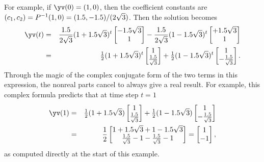 \begin{example}
\begin{solution}
For example, if \(\yv(0)=(1,0)\), then the coefficient constants are \((c_1,c_2)=P^{-1}(1,0)=(1.5,-1.5)/(2\sqrt3)\).
Then the solution becomes
\begin{eqnarray*}
\yv(t)&=&\frac \i{2\sqrt3}(1+\i\sqrt3)^t\begin{bmatrix} -\i\sqrt3\\1 \end{bmatrix}
-\frac{\i}{2\sqrt3}(1-\i\sqrt3)^t\begin{bmatrix} +\i\sqrt3\\1 \end{bmatrix}
\\&=&\tfrac 12(1+\i\sqrt3)^t\begin{bmatrix} 1\\\frac \i{\sqrt3} \end{bmatrix}
+\tfrac12(1-\i\sqrt3)^t\begin{bmatrix} 1\\-\frac \i{\sqrt3} \end{bmatrix}.
\end{eqnarray*}
Through the magic of the complex conjugate form of the two terms in this expression, the nonreal parts cancel to always give a real result.
For example, this complex formula predicts that at time step \(t=1\)
\begin{eqnarray*}
\yv(1)&=&\tfrac 12(1+\i\sqrt3)\begin{bmatrix} 1\\\frac \i{\sqrt3} \end{bmatrix}
+\tfrac12(1-\i\sqrt3)\begin{bmatrix} 1\\-\frac \i{\sqrt3} \end{bmatrix}
\\&=&\frac12\begin{bmatrix} 1+\i\sqrt3+1-\i\sqrt3\\
\frac \i{\sqrt3}-1-\frac \i{\sqrt3}-1 \end{bmatrix}
=\begin{bmatrix} 1\\-1 \end{bmatrix},
\end{eqnarray*}
as computed directly at the start of this example.
\end{solution}
\end{example}

